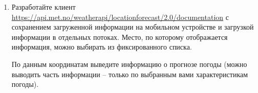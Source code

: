 \begin{enumerate}


	\item Разработайте клиент \url{https://api.met.no/weatherapi/locationforecast/2.0/documentation} с сохранением загруженной информации на мобильном устройстве и загрузкой
		информации в отдельных потоках. Место, по которому отображается информация, можно выбирать из фиксированного списка.

		По данным координатам выведите информацию о прогнозе погоды (можно выводить часть информации -- только по выбранным вами характеристикам
		погоды).






\end{enumerate}
